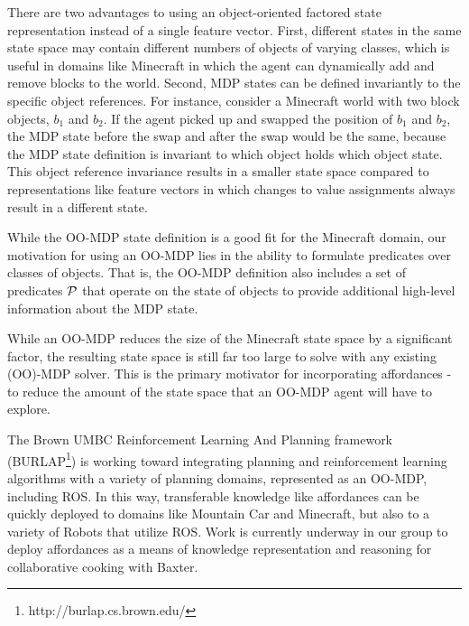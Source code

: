 \documentclass[letterpaper]{article}
\begin{document}
There are two advantages to using an object-oriented factored state
representation instead of a single feature vector. First, different
states in the same state space may contain different numbers of
objects of varying classes, which is useful in domains like Minecraft
in which the agent can dynamically add and remove blocks to the
world. Second, MDP states can be defined invariantly to the specific
object references.  For instance, consider a Minecraft world with two
block objects, $b_1$ and $b_2$.  If the agent picked up and swapped
the position of $b_1$ and $b_2$, the MDP state before the swap and
after the swap would be the same, because the MDP state definition is
invariant to which object holds which object state. 
This object reference invariance results in a smaller state space compared
to representations like feature vectors in which changes to value
assignments always result in a different state.

While the OO-MDP state definition is a good fit for the Minecraft
domain, our motivation for using an OO-MDP lies in the ability to
formulate predicates over classes of objects. That is, the OO-MDP
definition also includes a set of predicates ${\cal P}$ that operate
on the state of objects to provide additional high-level information
about the MDP state. 

While an OO-MDP reduces the size of the Minecraft state space
by a significant factor, the resulting state space is still far too large to
solve with any existing (OO)-MDP solver. This is the primary motivator
for incorporating affordances - to reduce the amount of the
state space that an OO-MDP agent will have to explore.

The Brown UMBC Reinforcement Learning And Planning framework (BURLAP\footnote{http://burlap.cs.brown.edu/})
is working toward integrating planning and reinforcement learning algorithms with a variety of planning domains, represented
as an OO-MDP, including ROS. In this way, transferable knowledge like affordances can be quickly deployed
to domains like Mountain Car \cite{Moore90efficientmemory-based} and Minecraft, but also to a variety
of Robots that utilize ROS. Work is currently underway in our group to deploy affordances as a
means of knowledge representation and reasoning for collaborative cooking with Baxter.
\end{document}
